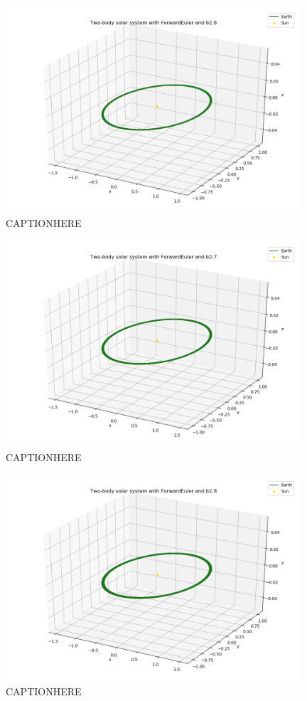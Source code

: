 \documentclass{article}
\begin{document}
    \begin{figure}[H]
        \centering
        \includegraphics[width = 11cm]{img/plot3D_S_E_F_b26.png}
        \caption{CAPTIONHERE}
        \label{fig:plot3D_S_E_F_b26}
    \end{figure}

    \begin{figure}[H]
        \centering
        \includegraphics[width = 11cm]{img/plot3D_S_E_F_b27.png}
        \caption{CAPTIONHERE}
        \label{fig:plot3D_S_E_F_b27}
    \end{figure}

    \begin{figure}[H]
        \centering
        \includegraphics[width = 11cm]{img/plot3D_S_E_F_b28.png}
        \caption{CAPTIONHERE}
        \label{fig:plot3D_S_E_F_b28}
    \end{figure}
\end{document}
